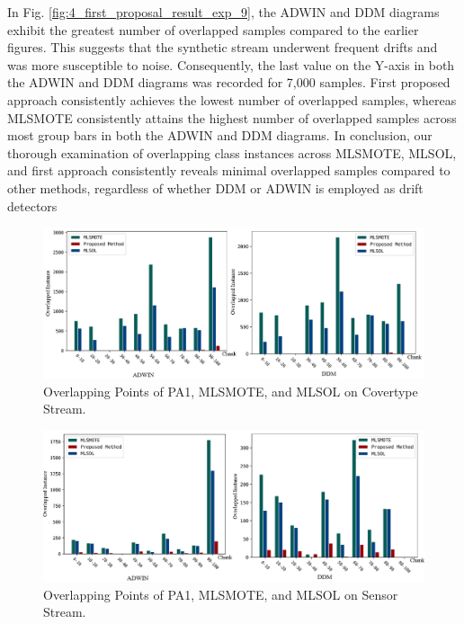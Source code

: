In Fig. \ref{fig:4_first_proposal_result_exp_9}, the ADWIN and DDM diagrams exhibit the greatest number of overlapped samples compared to the earlier figures. This suggests that the synthetic stream underwent frequent drifts and was more susceptible to noise. Consequently, the last value on the Y-axis in both the ADWIN and DDM diagrams was recorded for 7,000 samples. First proposed approach consistently achieves the lowest number of overlapped samples, whereas MLSMOTE consistently attains the highest number of overlapped samples across most group bars in both the ADWIN and DDM diagrams. In conclusion, our thorough examination of overlapping class instances across MLSMOTE, MLSOL, and first approach consistently reveals minimal overlapped samples compared to other methods, regardless of whether DDM or ADWIN is employed as drift detectors

\begin{figure}[!ht]
	\centering
	\includegraphics[width=1\linewidth]{4_Imbalanced/figures/exp_7.png}
  \caption{Overlapping Points of PA1, MLSMOTE, and MLSOL on Covertype Stream.}
	\label{fig:4_first_proposal_result_exp_7}
\end{figure}

\begin{figure}[!ht]
	\centering
	\includegraphics[width=1\linewidth]{4_Imbalanced/figures/exp_8.png}
  \caption{Overlapping Points of PA1, MLSMOTE, and MLSOL on Sensor Stream.}
	\label{fig:4_first_proposal_result_exp_8}
\end{figure}

